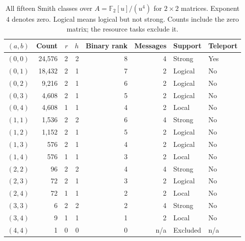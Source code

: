 \begin{table}[ht]\centering\small
\begin{tabular}{rrrrrrll}
\toprule
$(a,b)$ & Count & $r$ & $h$ & Binary rank & Messages & Support & Teleport\\\midrule
$(0,0)$ & 24,576 & 2 & 2 & 8 & 4 & Strong & Yes\\
$(0,1)$ & 18,432 & 2 & 1 & 7 & 2 & Logical & No\\
$(0,2)$ & 9,216 & 2 & 1 & 6 & 2 & Logical & No\\
$(0,3)$ & 4,608 & 2 & 1 & 5 & 2 & Logical & No\\
$(0,4)$ & 4,608 & 1 & 1 & 4 & 2 & Local & No\\
$(1,1)$ & 1,536 & 2 & 2 & 6 & 4 & Strong & No\\
$(1,2)$ & 1,152 & 2 & 1 & 5 & 2 & Logical & No\\
$(1,3)$ & 576 & 2 & 1 & 4 & 2 & Logical & No\\
$(1,4)$ & 576 & 1 & 1 & 3 & 2 & Local & No\\
$(2,2)$ & 96 & 2 & 2 & 4 & 4 & Strong & No\\
$(2,3)$ & 72 & 2 & 1 & 3 & 2 & Logical & No\\
$(2,4)$ & 72 & 1 & 1 & 2 & 2 & Local & No\\
$(3,3)$ & 6 & 2 & 2 & 2 & 4 & Strong & No\\
$(3,4)$ & 9 & 1 & 1 & 1 & 2 & Local & No\\
$(4,4)$ & 1 & 0 & 0 & 0 & n/a & Excluded & n/a\\
\bottomrule\end{tabular}
\caption{All fifteen Smith classes over $A=\mathbb F_2[u]/(u^4)$ for $2\times2$ matrices. Exponent $4$ denotes zero. Logical means logical but not strong. Counts include the zero matrix; the resource tasks exclude it.}\label{tab:smith}
\end{table}
